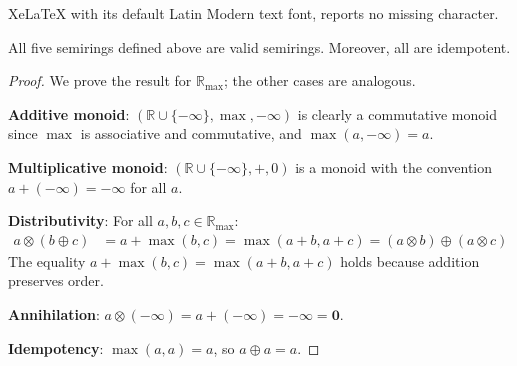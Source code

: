 \documentclass[10pt,a4paper]{amsart}
\newcommand{\Rmax}{\mathbb{R}_{\max}}
\begin{document}
XeLaTeX with its default Latin Modern text font, reports no missing character.
\begin{theorem}
\label{thm:tropical-properties}
All five semirings defined above are valid semirings. Moreover, all are idempotent.
\end{theorem}

\begin{proof}
We prove the result for $\Rmax$; the other cases are analogous.

\textbf{Additive monoid}: $(\mathbb{R} \cup \{-\infty\}, \max, -\infty)$ is clearly a commutative monoid since $\max$ is associative and commutative, and $\max(a, -\infty) = a$.

\textbf{Multiplicative monoid}: $(\mathbb{R} \cup \{-\infty\}, +, 0)$ is a monoid with the convention $a + (-\infty) = -\infty$ for all $a$.

\textbf{Distributivity}: For all $a, b, c \in \Rmax$:
\begin{align*}
    a \otimes (b \oplus c) &= a + \max(b, c) = \max(a + b, a + c) = (a \otimes b) \oplus (a \otimes c)
\end{align*}
The equality $a + \max(b, c) = \max(a + b, a + c)$ holds because addition preserves order.

\textbf{Annihilation}: $a \otimes (-\infty) = a + (-\infty) = -\infty = \mathbf{0}$.

\textbf{Idempotency}: $\max(a, a) = a$, so $a \oplus a = a$.
\end{proof}
\end{document}
